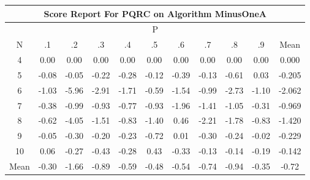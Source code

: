 \documentclass[11pt,a4paper]{report}
\begin{document}
\begin{longtable}{ | c || c | c | c | c | c | c | c | c | c || c |}
\hline
\multicolumn{11}{|c|}{ Score Report For PQRC on Algorithm MinusOneA} \\
\hline
\multicolumn{11}{|c|}{ P } \\
\hline
N & .1 & .2 & .3 & .4 & .5 & .6 & .7 & .8 & .9 & Mean\\
 \hline
 \hline
 \endhead
  4 &  \cellcolor[HTML]{FFFFFF} 0.00 &  \cellcolor[HTML]{FFFFFF} 0.00 &  \cellcolor[HTML]{FFFFFF} 0.00 &  \cellcolor[HTML]{FFFFFF} 0.00 &  \cellcolor[HTML]{FFFFFF} 0.00 &  \cellcolor[HTML]{FFFFFF} 0.00 &  \cellcolor[HTML]{FFFFFF} 0.00 &  \cellcolor[HTML]{FFFFFF} 0.00 &  \cellcolor[HTML]{FFFFFF} 0.00 & 0.000 \\
  5 &  \cellcolor[HTML]{FFFFFF} -0.08 &  \cellcolor[HTML]{FFFFFF} -0.05 &  \cellcolor[HTML]{FFF7F7} -0.22 &  \cellcolor[HTML]{FFF7F7} -0.28 &  \cellcolor[HTML]{FFFFFF} -0.12 &  \cellcolor[HTML]{FFF7F7} -0.39 &  \cellcolor[HTML]{FFFFFF} -0.13 &  \cellcolor[HTML]{FFEFEF} -0.61 &  \cellcolor[HTML]{FFFFFF} 0.03 & -0.205 \\
  6 &  \cellcolor[HTML]{FFE7E7} -1.03 &  \cellcolor[HTML]{FF6868} -5.96 &  \cellcolor[HTML]{FFB7B7} -2.91 &  \cellcolor[HTML]{FFD7D7} -1.71 &  \cellcolor[HTML]{FFEFEF} -0.59 &  \cellcolor[HTML]{FFD7D7} -1.54 &  \cellcolor[HTML]{FFE7E7} -0.99 &  \cellcolor[HTML]{FFB7B7} -2.73 &  \cellcolor[HTML]{FFE7E7} -1.10 & -2.062 \\
  7 &  \cellcolor[HTML]{FFF7F7} -0.38 &  \cellcolor[HTML]{FFE7E7} -0.99 &  \cellcolor[HTML]{FFE7E7} -0.93 &  \cellcolor[HTML]{FFEFEF} -0.77 &  \cellcolor[HTML]{FFE7E7} -0.93 &  \cellcolor[HTML]{FFCFCF} -1.96 &  \cellcolor[HTML]{FFDFDF} -1.41 &  \cellcolor[HTML]{FFE7E7} -1.05 &  \cellcolor[HTML]{FFF7F7} -0.31 & -0.969 \\
  8 &  \cellcolor[HTML]{FFEFEF} -0.62 &  \cellcolor[HTML]{FF9797} -4.05 &  \cellcolor[HTML]{FFD7D7} -1.51 &  \cellcolor[HTML]{FFE7E7} -0.83 &  \cellcolor[HTML]{FFDFDF} -1.40 &  \cellcolor[HTML]{F7F7FF} 0.46 &  \cellcolor[HTML]{FFC7C7} -2.21 &  \cellcolor[HTML]{FFCFCF} -1.78 &  \cellcolor[HTML]{FFE7E7} -0.83 & -1.420 \\
  9 &  \cellcolor[HTML]{FFFFFF} -0.05 &  \cellcolor[HTML]{FFF7F7} -0.30 &  \cellcolor[HTML]{FFF7F7} -0.20 &  \cellcolor[HTML]{FFF7F7} -0.23 &  \cellcolor[HTML]{FFEFEF} -0.72 &  \cellcolor[HTML]{FFFFFF} 0.01 &  \cellcolor[HTML]{FFF7F7} -0.30 &  \cellcolor[HTML]{FFF7F7} -0.24 &  \cellcolor[HTML]{FFFFFF} -0.02 & -0.229 \\
  10 &  \cellcolor[HTML]{FFFFFF} 0.06 &  \cellcolor[HTML]{FFF7F7} -0.27 &  \cellcolor[HTML]{FFF7F7} -0.43 &  \cellcolor[HTML]{FFF7F7} -0.28 &  \cellcolor[HTML]{F7F7FF} 0.43 &  \cellcolor[HTML]{FFF7F7} -0.33 &  \cellcolor[HTML]{FFFFFF} -0.13 &  \cellcolor[HTML]{FFFFFF} -0.14 &  \cellcolor[HTML]{FFF7F7} -0.19 & -0.142 \\
 \hline
 \hline
Mean &  \cellcolor[HTML]{FFF7F7} -0.30 &  \cellcolor[HTML]{FFD7D7} -1.66 &  \cellcolor[HTML]{FFE7E7} -0.89 &  \cellcolor[HTML]{FFEFEF} -0.59 &  \cellcolor[HTML]{FFEFEF} -0.48 &  \cellcolor[HTML]{FFEFEF} -0.54 &  \cellcolor[HTML]{FFEFEF} -0.74 &  \cellcolor[HTML]{FFE7E7} -0.94 &  \cellcolor[HTML]{FFF7F7} -0.35 &  \cellcolor[HTML]{FFEFEF} -0.72
\end{longtable}
\end{document}
